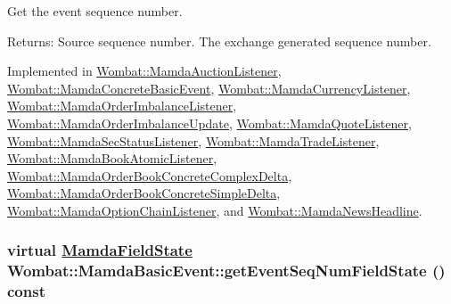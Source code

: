 Get the event sequence number. 

\begin{Desc}
\item[Returns:]Source sequence number. The exchange generated sequence number. \end{Desc}


Implemented in \hyperlink{classWombat_1_1MamdaAuctionListener_22c842018863f4240872c7f7eb193b98}{Wombat::Mamda\-Auction\-Listener}, \hyperlink{classWombat_1_1MamdaConcreteBasicEvent_f77bc954633096ff731212ed5b86c3a7}{Wombat::Mamda\-Concrete\-Basic\-Event}, \hyperlink{classWombat_1_1MamdaCurrencyListener_4d9a6975f01379ea3f3bfbf11ae1fb13}{Wombat::Mamda\-Currency\-Listener}, \hyperlink{classWombat_1_1MamdaOrderImbalanceListener_3a6ecd36b855f2e1f122d07764a6b691}{Wombat::Mamda\-Order\-Imbalance\-Listener}, \hyperlink{classWombat_1_1MamdaOrderImbalanceUpdate_f0ea246f8936ce1fa502a9972486c1ec}{Wombat::Mamda\-Order\-Imbalance\-Update}, \hyperlink{classWombat_1_1MamdaQuoteListener_fa0883ea81d5b2286d1014616407b690}{Wombat::Mamda\-Quote\-Listener}, \hyperlink{classWombat_1_1MamdaSecStatusListener_9abaf40f14dcb761b11026bd8ab7cd7d}{Wombat::Mamda\-Sec\-Status\-Listener}, \hyperlink{classWombat_1_1MamdaTradeListener_8289ac1ca750b7fb99e29c122e37caad}{Wombat::Mamda\-Trade\-Listener}, \hyperlink{classWombat_1_1MamdaBookAtomicListener_8110769b71d79b631531693c52449b72}{Wombat::Mamda\-Book\-Atomic\-Listener}, \hyperlink{classWombat_1_1MamdaOrderBookConcreteComplexDelta_3d8aa02a57d01ca4b42fde98a1c8b2dc}{Wombat::Mamda\-Order\-Book\-Concrete\-Complex\-Delta}, \hyperlink{classWombat_1_1MamdaOrderBookConcreteSimpleDelta_26416a9ac3afef654acc376abb484506}{Wombat::Mamda\-Order\-Book\-Concrete\-Simple\-Delta}, \hyperlink{classWombat_1_1MamdaOptionChainListener_936a15ecd68edbee310aba01fc7ae7b5}{Wombat::Mamda\-Option\-Chain\-Listener}, and \hyperlink{classWombat_1_1MamdaNewsHeadline_f89a01f21fc32da059c7ab954f5d15c6}{Wombat::Mamda\-News\-Headline}.\hypertarget{classWombat_1_1MamdaBasicEvent_51cc0b9d4c2b8a982ccd18b339707cb5}{
\subsubsection[getEventSeqNumFieldState]{\setlength{\rightskip}{0pt plus 5cm}virtual \hyperlink{namespaceWombat_93aac974f2ab713554fd12a1fa3b7d2a}{Mamda\-Field\-State} Wombat::Mamda\-Basic\-Event::get\-Event\-Seq\-Num\-Field\-State () const}}
\label{classWombat_1_1MamdaBasicEvent_51cc0b9d4c2b8a982ccd18b339707cb5}


